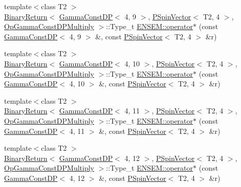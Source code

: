 \begin{DoxyCompactItemize}
\item 
{\footnotesize template$<$class T2 $>$ }\\\mbox{\hyperlink{structENSEM_1_1BinaryReturn}{Binary\+Return}}$<$ \mbox{\hyperlink{classENSEM_1_1GammaConstDP}{Gamma\+Const\+DP}}$<$ 4, 9 $>$, \mbox{\hyperlink{classENSEM_1_1PSpinVector}{P\+Spin\+Vector}}$<$ T2, 4 $>$, \mbox{\hyperlink{structENSEM_1_1OpGammaConstDPMultiply}{Op\+Gamma\+Const\+D\+P\+Multiply}} $>$\+::Type\+\_\+t \mbox{\hyperlink{group__primspinvector_ga39c7d40232a2f254a4b3903a51cb61db}{E\+N\+S\+E\+M\+::operator$\ast$}} (const \mbox{\hyperlink{classENSEM_1_1GammaConstDP}{Gamma\+Const\+DP}}$<$ 4, 9 $>$ \&, const \mbox{\hyperlink{classENSEM_1_1PSpinVector}{P\+Spin\+Vector}}$<$ T2, 4 $>$ \&r)
\item 
{\footnotesize template$<$class T2 $>$ }\\\mbox{\hyperlink{structENSEM_1_1BinaryReturn}{Binary\+Return}}$<$ \mbox{\hyperlink{classENSEM_1_1GammaConstDP}{Gamma\+Const\+DP}}$<$ 4, 10 $>$, \mbox{\hyperlink{classENSEM_1_1PSpinVector}{P\+Spin\+Vector}}$<$ T2, 4 $>$, \mbox{\hyperlink{structENSEM_1_1OpGammaConstDPMultiply}{Op\+Gamma\+Const\+D\+P\+Multiply}} $>$\+::Type\+\_\+t \mbox{\hyperlink{group__primspinvector_gaba02d1dbf98d31e3ed096064681c46aa}{E\+N\+S\+E\+M\+::operator$\ast$}} (const \mbox{\hyperlink{classENSEM_1_1GammaConstDP}{Gamma\+Const\+DP}}$<$ 4, 10 $>$ \&, const \mbox{\hyperlink{classENSEM_1_1PSpinVector}{P\+Spin\+Vector}}$<$ T2, 4 $>$ \&r)
\item 
{\footnotesize template$<$class T2 $>$ }\\\mbox{\hyperlink{structENSEM_1_1BinaryReturn}{Binary\+Return}}$<$ \mbox{\hyperlink{classENSEM_1_1GammaConstDP}{Gamma\+Const\+DP}}$<$ 4, 11 $>$, \mbox{\hyperlink{classENSEM_1_1PSpinVector}{P\+Spin\+Vector}}$<$ T2, 4 $>$, \mbox{\hyperlink{structENSEM_1_1OpGammaConstDPMultiply}{Op\+Gamma\+Const\+D\+P\+Multiply}} $>$\+::Type\+\_\+t \mbox{\hyperlink{group__primspinvector_gad1bc0eb5b6f881a32c6fda1e7b14d083}{E\+N\+S\+E\+M\+::operator$\ast$}} (const \mbox{\hyperlink{classENSEM_1_1GammaConstDP}{Gamma\+Const\+DP}}$<$ 4, 11 $>$ \&, const \mbox{\hyperlink{classENSEM_1_1PSpinVector}{P\+Spin\+Vector}}$<$ T2, 4 $>$ \&r)
\item 
{\footnotesize template$<$class T2 $>$ }\\\mbox{\hyperlink{structENSEM_1_1BinaryReturn}{Binary\+Return}}$<$ \mbox{\hyperlink{classENSEM_1_1GammaConstDP}{Gamma\+Const\+DP}}$<$ 4, 12 $>$, \mbox{\hyperlink{classENSEM_1_1PSpinVector}{P\+Spin\+Vector}}$<$ T2, 4 $>$, \mbox{\hyperlink{structENSEM_1_1OpGammaConstDPMultiply}{Op\+Gamma\+Const\+D\+P\+Multiply}} $>$\+::Type\+\_\+t \mbox{\hyperlink{group__primspinvector_gab182b2b8559b1382be36d58f251cec0e}{E\+N\+S\+E\+M\+::operator$\ast$}} (const \mbox{\hyperlink{classENSEM_1_1GammaConstDP}{Gamma\+Const\+DP}}$<$ 4, 12 $>$ \&, const \mbox{\hyperlink{classENSEM_1_1PSpinVector}{P\+Spin\+Vector}}$<$ T2, 4 $>$ \&r)

\end{DoxyCompactItemize}
